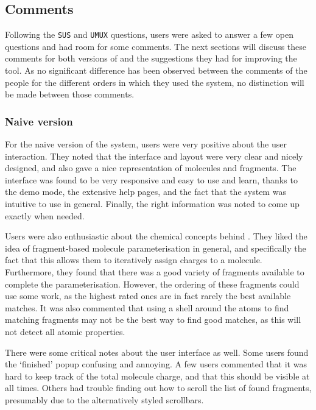 \subsection{Comments}
Following the \verb|SUS| and \verb|UMUX| questions, users were asked to answer a few open questions and had room for some comments. The next sections will discuss these comments for both versions of \oframp{} and the suggestions they had for improving the tool. As no significant difference has been observed between the comments of the people for the different orders in which they used the system, no distinction will be made between those comments.

\subsubsection{Naive version}
For the naive version of the system, users were very positive about the user interaction. They noted that the interface and layout were very clear and nicely designed, and also gave a nice representation of molecules and fragments. The interface was found to be very responsive and easy to use and learn, thanks to the demo mode, the extensive help pages, and the fact that the system was intuitive to use in general. Finally, the right information was noted to come up exactly when needed.

Users were also enthusiastic about the chemical concepts behind \oframp. They liked the idea of fragment-based molecule parameterisation in general, and specifically the fact that this allows them to iteratively assign charges to a molecule. Furthermore, they found that there was a good variety of fragments available to complete the parameterisation. However, the ordering of these fragments could use some work, as the highest rated ones are in fact rarely the best available matches. It was also commented that using a shell around the atoms to find matching fragments may not be the best way to find good matches, as this will not detect all atomic properties.


There were some critical notes about the user interface as well. Some users found the `finished' popup confusing and annoying. A few users commented that it was hard to keep track of the total molecule charge, and that this should be visible at all times. Others had trouble finding out how to scroll the list of found fragments, presumably due to the alternatively styled scrollbars.

